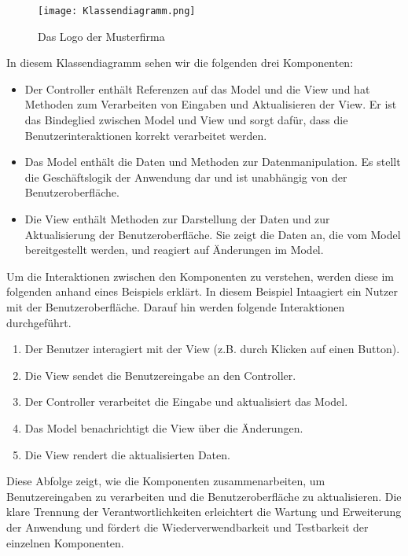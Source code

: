 \begin{figure}[h]
\centering
\texttt{[image: Klassendiagramm.png]}
\caption{Das Logo der Musterfirma\footnotemark}
\end{figure}

In diesem Klassendiagramm sehen wir die folgenden drei Komponenten:

\begin{itemize}
\item Der Controller enthält Referenzen auf das Model und die View und hat Methoden zum Verarbeiten von Eingaben und Aktualisieren der View. Er ist das Bindeglied zwischen Model und View und sorgt dafür, dass die Benutzerinteraktionen korrekt verarbeitet werden.

\item Das Model enthält die Daten und Methoden zur Datenmanipulation. Es stellt die Geschäftslogik der Anwendung dar und ist unabhängig von der Benutzeroberfläche.

\item Die View enthält Methoden zur Darstellung der Daten und zur Aktualisierung der Benutzeroberfläche. Sie zeigt die Daten an, die vom Model bereitgestellt werden, und reagiert auf Änderungen im Model.
\end{itemize}

Um die Interaktionen zwischen den Komponenten zu verstehen, werden diese im folgenden anhand eines Beispiels erklärt. In diesem Beispiel Intaagiert ein Nutzer mit der Benutzeroberfläche. Darauf hin werden folgende Interaktionen durchgeführt.

\begin{enumerate}
\item Der Benutzer interagiert mit der View (z.B. durch Klicken auf einen Button).

\item Die View sendet die Benutzereingabe an den Controller.

\item Der Controller verarbeitet die Eingabe und aktualisiert das Model.

\item Das Model benachrichtigt die View über die Änderungen.

\item Die View rendert die aktualisierten Daten.
\end{enumerate}

Diese Abfolge zeigt, wie die Komponenten zusammenarbeiten, um Benutzereingaben zu verarbeiten und die Benutzeroberfläche zu aktualisieren. Die klare Trennung der Verantwortlichkeiten erleichtert die Wartung und Erweiterung der Anwendung und fördert die Wiederverwendbarkeit und Testbarkeit der einzelnen Komponenten.

